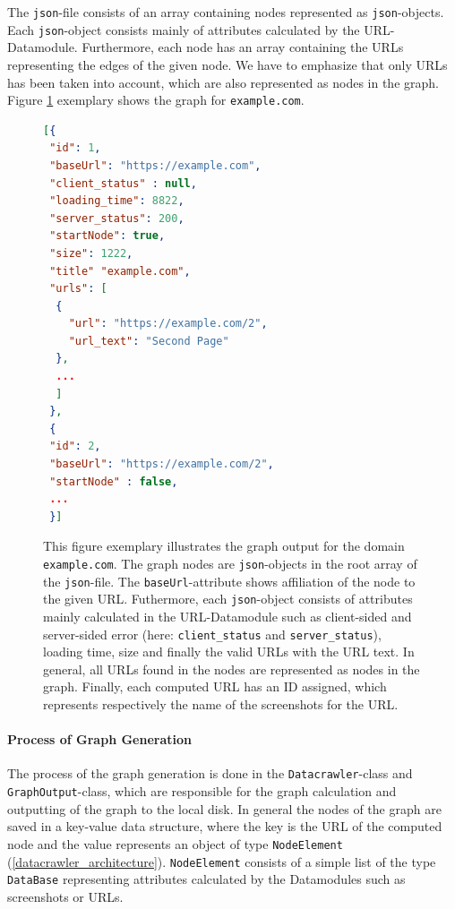 The \texttt{json}-file consists of an array containing nodes represented as \texttt{json}-objects. Each \texttt{json}-object consists mainly of attributes calculated by the URL-Datamodule. Furthermore, each node has an array containing the URLs representing the edges of the given node. We have to emphasize that only URLs has been taken into account, which are also represented as nodes in the graph. Figure \ref{examplecom_graph} exemplary shows the graph for \texttt{example.com}.
\begin{figure}
\centering
\begin{lstlisting}[language=json,firstnumber=1]
[{
 "id": 1,
 "baseUrl": "https://example.com",
 "client_status" : null,
 "loading_time": 8822,
 "server_status": 200,
 "startNode": true,
 "size": 1222,
 "title" "example.com",
 "urls": [
  {
    "url": "https://example.com/2",
    "url_text": "Second Page"
  },
  ...
  ]
 },
 {
 "id": 2,
 "baseUrl": "https://example.com/2",
 "startNode" : false,
 ...
 }]
\end{lstlisting}
\caption{This figure exemplary illustrates the graph output for the domain \texttt{example.com}. The graph nodes are \texttt{json}-objects in the root array of the \texttt{json}-file. The \texttt{baseUrl}-attribute shows affiliation of the node to the given URL. Futhermore, each \texttt{json}-object consists of attributes mainly calculated in the URL-Datamodule such as client-sided and server-sided error (here: \texttt{client\_status} and \texttt{server\_status}), loading time, size and finally the valid URLs with the URL text. In general, all URLs found in the nodes are represented as nodes in the graph. Finally, each computed URL has an ID assigned, which represents respectively the name of the screenshots for the URL.}
\label{examplecom_graph}
\end{figure}

\paragraph{Process of Graph Generation} 
The process of the graph generation is done in the \texttt{Datacrawler}-class and \texttt{GraphOutput}-class, which are responsible for the graph calculation and outputting of the graph to the local disk. In general the nodes of the graph are saved in a key-value data structure, where the key is the URL of the computed node and the value represents an object of type \texttt{NodeElement} (\ref{datacrawler_architecture}). \texttt{NodeElement} consists of a simple list of the type \texttt{DataBase} representing attributes calculated by the Datamodules such as screenshots or URLs.

